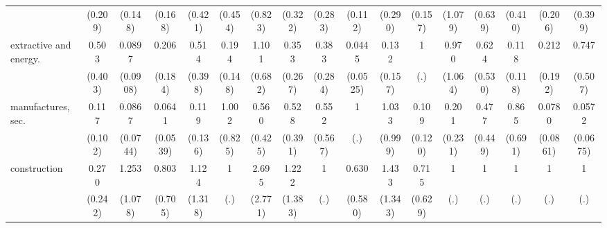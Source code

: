 {\begin{tabular}{l*{16}{c}}
                    &     (0.209)         &     (0.148)         &     (0.168)         &     (0.421)         &     (0.454)         &     (0.823)         &     (0.322)         &     (0.283)         &     (0.112)         &     (0.290)         &     (0.157)         &     (1.079)         &     (0.639)         &     (0.410)         &     (0.206)         &     (0.399)         \\
[1em]
extractive and energy.&       0.503         &      0.0897\sym{*}  &       0.206         &       0.514         &       0.194\sym{*}  &       1.101         &       0.353         &       0.383         &      0.0445\sym{**} &       0.132         &           1         &       0.970         &       0.624         &       0.118\sym{*}  &       0.212         &       0.747         \\
                    &     (0.403)         &    (0.0908)         &     (0.184)         &     (0.398)         &     (0.148)         &     (0.682)         &     (0.267)         &     (0.284)         &    (0.0525)         &     (0.157)         &         (.)         &     (1.064)         &     (0.530)         &     (0.118)         &     (0.192)         &     (0.507)         \\
[1em]
manufactures, sec.  &       0.117\sym{*}  &      0.0867\sym{**} &      0.0641\sym{**} &       0.119         &       1.002         &       0.560         &       0.528         &       0.552         &           1         &       1.033         &       0.109\sym{*}  &       0.201         &       0.477         &       0.865         &      0.0780\sym{*}  &      0.0572\sym{*}  \\
                    &     (0.102)         &    (0.0744)         &    (0.0539)         &     (0.136)         &     (0.825)         &     (0.425)         &     (0.391)         &     (0.567)         &         (.)         &     (0.999)         &     (0.120)         &     (0.231)         &     (0.449)         &     (0.691)         &    (0.0861)         &    (0.0675)         \\
[1em]
construction        &       0.270         &       1.253         &       0.803         &       1.124         &           1         &       2.695         &       1.222         &           1         &       0.630         &       1.433         &       0.715         &           1         &           1         &           1         &           1         &           1         \\
                    &     (0.242)         &     (1.078)         &     (0.705)         &     (1.318)         &         (.)         &     (2.771)         &     (1.383)         &         (.)         &     (0.580)         &     (1.343)         &     (0.629)         &         (.)         &         (.)         &         (.)         &         (.)         &         (.)         \\

\end{tabular}}
